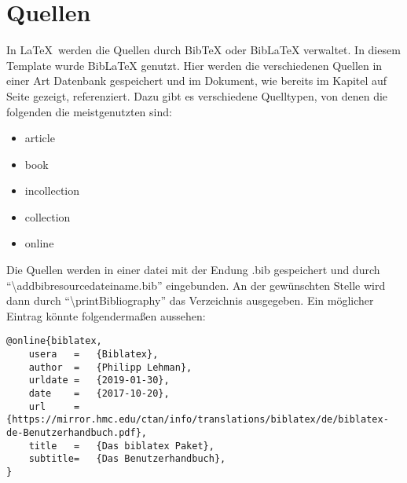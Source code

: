 \chapter{Quellen}
In \LaTeX\ werden die Quellen durch BibTeX oder BibLaTeX verwaltet. In diesem Template wurde BibLaTeX genutzt. Hier werden die verschiedenen Quellen in einer Art Datenbank gespeichert und im Dokument, wie bereits im Kapitel  auf Seite \pageref{ch:zitieren} gezeigt, referenziert. Dazu gibt es verschiedene Quelltypen, von denen die folgenden die meistgenutzten sind:\autocite[Vgl.][7]{biblatex}
\begin{itemize}
  \item article
  \item book
  \item incollection
  \item collection
  \item online
\end{itemize}
Die Quellen werden in einer datei mit der Endung .bib gespeichert und durch \enquote{\textbackslash addbibresource{dateiname.bib}} eingebunden. An der gewünschten Stelle wird dann durch \enquote{\textbackslash printBibliography} das Verzeichnis ausgegeben. Ein möglicher Eintrag könnte folgendermaßen aussehen:
\begin{lstlisting}
@online{biblatex,
    usera	=	{Biblatex},
    author	=	{Philipp Lehman},
    urldate	=	{2019-01-30},
    date	=	{2017-10-20},
    url		=	{https://mirror.hmc.edu/ctan/info/translations/biblatex/de/biblatex-de-Benutzerhandbuch.pdf},
    title	=	{Das biblatex Paket},
    subtitle=   {Das Benutzerhandbuch},
}
\end{lstlisting}